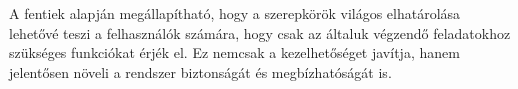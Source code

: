A fentiek alapján megállapítható, hogy a szerepkörök világos elhatárolása lehetővé teszi a felhasználók számára, hogy csak az általuk végzendő feladatokhoz szükséges funkciókat érjék el. Ez nemcsak a kezelhetőséget javítja, hanem jelentősen növeli a rendszer biztonságát és megbízhatóságát is.





